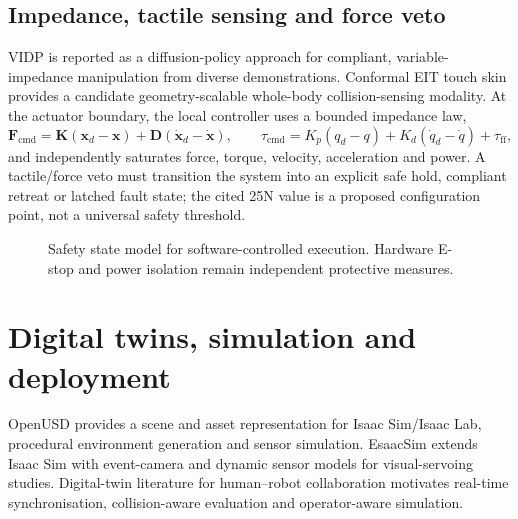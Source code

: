 \documentclass[10pt,a4paper]{article}
\begin{document}
\subsection{Impedance, tactile sensing and force veto}
VIDP is reported as a diffusion-policy approach for compliant, variable-impedance manipulation from diverse demonstrations.\cite{vidp} Conformal EIT touch skin provides a candidate geometry-scalable whole-body collision-sensing modality.\cite{eit} At the actuator boundary, the local controller uses a bounded impedance law,
\begin{equation}
\mathbf{F}_{\mathrm{cmd}}=\mathbf{K}(\mathbf{x}_d-\mathbf{x})+\mathbf{D}(\dot{\mathbf{x}}_d-\dot{\mathbf{x}}), \qquad
\tau_{\mathrm{cmd}}=K_p(q_d-q)+K_d(\dot q_d-\dot q)+\tau_{\mathrm{ff}},
\end{equation}
and independently saturates force, torque, velocity, acceleration and power. A tactile/force veto must transition the system into an explicit safe hold, compliant retreat or latched fault state; the cited 25N value is a proposed configuration point, not a universal safety threshold.

\begin{figure}[ht]
\centering
{}
\caption{Safety state model for software-controlled execution. Hardware E-stop and power isolation remain independent protective measures.}
\label{fig:safety}
\end{figure}

\section{Digital twins, simulation and deployment}
OpenUSD provides a scene and asset representation for Isaac Sim/Isaac Lab, procedural environment generation and sensor simulation. EsaacSim extends Isaac Sim with event-camera and dynamic sensor models for visual-servoing studies.\cite{isaaclab,esaac} Digital-twin literature for human--robot collaboration motivates real-time synchronisation, collision-aware evaluation and operator-aware simulation.\cite{dtwin}
\end{document}
